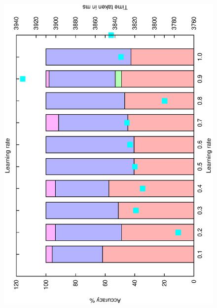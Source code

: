 \documentclass[12pt,a4,notitlepage]{report}
\renewcommand{\_}{\texttt{\symbol{95}}}
\newcommand{\<}{\texttt{\symbol{60}}}
\renewcommand{\>}{\texttt{\symbol{62}}}
\begin{document}
\begin{figure}
\centering
\includegraphics[scale=0.3,angle=-90]{results/neural/n_learning_rate.ps}

\end{figure}
\end{document}
